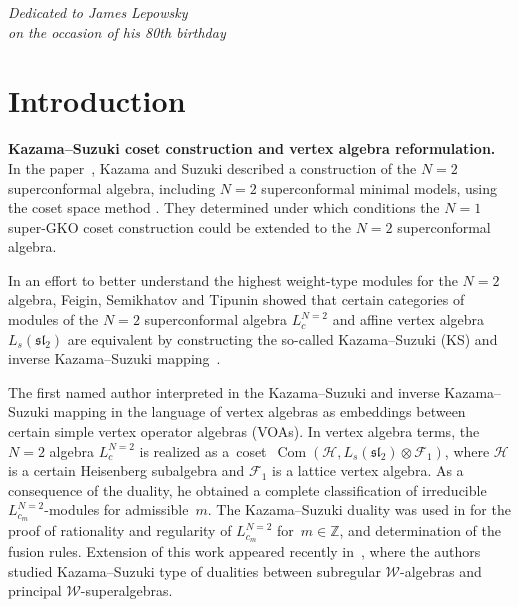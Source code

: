 \documentclass[pdftex]{sigma}
\numberwithin{equation}{section}
\newcommand{\Z}{\mathbb Z}
\newcommand{\F}{\mathcal F}
\begin{document}


\begin{flushright}
\begin{minipage}{58mm}
\it Dedicated to James Lepowsky\\ on the occasion of his 80th birthday
\end{minipage}
\end{flushright}


\renewcommand{\thefootnote}{\arabic{footnote}}
\setcounter{footnote}{0}

\section{Introduction}

{\bf Kazama--Suzuki coset construction and vertex algebra reformulation.} In the paper~\cite{KS}, Kazama and Suzuki described a construction of the $N=2$ superconformal algebra, including $N=2$ superconformal minimal models, using the coset space method \cite{GKO}. They determined under which conditions the $N=1$ super-GKO coset construction could be extended to the $N = 2$ superconformal algebra.

In an effort to better understand the highest weight-type modules for the $N = 2$ algebra, Feigin, Semikhatov and Tipunin showed that certain categories of modules of the $N = 2$ superconformal algebra $L^{N=2}_{c}$ and affine vertex algebra $L_s(\mathfrak{sl}_2)$ are equivalent by constructing the so-called Kazama--Suzuki (KS) and inverse Kazama--Suzuki mapping~\cite{FST}.

The first named author interpreted in \cite{A-IMRN} the Kazama--Suzuki \cite{KS} and inverse Kazama--Suzuki mapping \cite{FST} in the language of vertex algebras as embeddings between certain simple vertex operator algebras (VOAs). In vertex algebra terms, the $N = 2$ algebra $L^{N=2}_c$ is realized as a~coset~${\operatorname{Com} (\mathcal{H}, L_s(\mathfrak{sl}_2) \otimes \F_1)}$, where $\mathcal H$ is a certain Heisenberg subalgebra and $\F_1$ is a lattice vertex algebra. As a consequence of the duality, he obtained a complete classification of irreducible $L^{N=2}_{c_m}$-modules for admissible~$m$. The Kazama--Suzuki duality was used in \cite{A-2001} for the proof of rationality and regularity of $L^{N=2}_{c_m}$ for~${m \in {\Z}}$, and determination of the fusion rules.
 Extension of this work appeared recently in~\cite{CGN}, where the authors studied Kazama--Suzuki type of dualities between subregular $\mathcal{W}$-algebras and principal $\mathcal{W}$-superalgebras.
\end{document}
